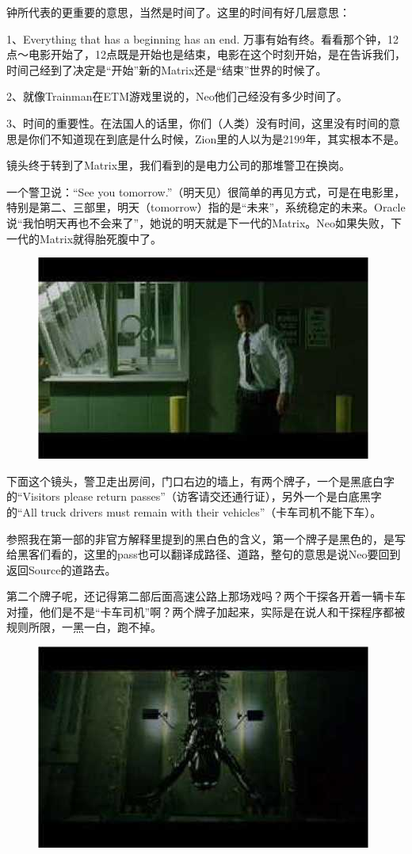 \documentclass[UTF8]{ctexart}
\begin{document}
钟所代表的更重要的意思，当然是时间了。这里的时间有好几层意思：

1、Everything that has a beginning has an end. 万事有始有终。看看那个钟，12点～电影开始了，12点既是开始也是结束，电影在这个时刻开始，是在告诉我们，时间己经到了决定是“开始”新的Matrix还是“结束”世界的时候了。

2、就像Trainman在ETM游戏里说的，Neo他们己经没有多少时间了。

3、时间的重要性。在法国人的话里，你们（人类）没有时间，这里没有时间的意思是你们不知道现在到底是什么时候，Zion里的人以为是2199年，其实根本不是。

镜头终于转到了Matrix里，我们看到的是电力公司的那堆警卫在换岗。

一个警卫说：“See you tomorrow.”（明天见）很简单的再见方式，可是在电影里，特别是第二、三部里，明天（tomorrow）指的是“未来”，系统稳定的未来。Oracle说“我怕明天再也不会来了”，她说的明天就是下一代的Matrix。Neo如果失败，下一代的Matrix就得胎死腹中了。

\begin{figure}[htb]
\centering
\includegraphics[width=0.5\linewidth]{fig/read_reloaded-5}
\end{figure}

下面这个镜头，警卫走出房间，门口右边的墙上，有两个牌子，一个是黑底白字的“Visitors please return passes”（访客请交还通行证），另外一个是白底黑字的“All truck drivers must remain with their vehicles”（卡车司机不能下车）。

参照我在第一部的非官方解释里提到的黑白色的含义，第一个牌子是黑色的，是写给黑客们看的，这里的pass也可以翻译成路径、道路，整句的意思是说Neo要回到返回Source的道路去。

第二个牌子呢，还记得第二部后面高速公路上那场戏吗？两个干探各开着一辆卡车对撞，他们是不是“卡车司机”啊？两个牌子加起来，实际是在说人和干探程序都被规则所限，一黑一白，跑不掉。

\begin{figure}[htb]
\centering
\includegraphics[width=0.5\linewidth]{fig/read_reloaded-6}
\end{figure}
\end{document}

